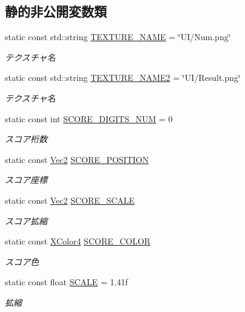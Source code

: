 \subsection*{静的非公開変数類}
\begin{DoxyCompactItemize}
\item 
static const std\+::string \mbox{\hyperlink{class_clear_logo_draw_aea89948b2e9b540fe35f1c910824c82f}{T\+E\+X\+T\+U\+R\+E\+\_\+\+N\+A\+ME}} = \char`\"{}UI/Num.\+png\char`\"{}
\begin{DoxyCompactList}\small\item\em テクスチャ名 \end{DoxyCompactList}\item 
static const std\+::string \mbox{\hyperlink{class_clear_logo_draw_a0688794f9d828c82cf0225ca91e4b491}{T\+E\+X\+T\+U\+R\+E\+\_\+\+N\+A\+M\+E2}} = \char`\"{}UI/Result.\+png\char`\"{}
\begin{DoxyCompactList}\small\item\em テクスチャ名 \end{DoxyCompactList}\item 
static const int \mbox{\hyperlink{class_clear_logo_draw_a50f368e8ecf24e1f701f7a522b9635f1}{S\+C\+O\+R\+E\+\_\+\+D\+I\+G\+I\+T\+S\+\_\+\+N\+UM}} = 0
\begin{DoxyCompactList}\small\item\em スコア桁数 \end{DoxyCompactList}\item 
static const \mbox{\hyperlink{_vector3_d_8h_a5ef6e95dfc5f9d3820b71772d99bbc25}{Vec2}} \mbox{\hyperlink{class_clear_logo_draw_ad3e2ab6e607fbf850696affe9ee47bd2}{S\+C\+O\+R\+E\+\_\+\+P\+O\+S\+I\+T\+I\+ON}}
\begin{DoxyCompactList}\small\item\em スコア座標 \end{DoxyCompactList}\item 
static const \mbox{\hyperlink{_vector3_d_8h_a5ef6e95dfc5f9d3820b71772d99bbc25}{Vec2}} \mbox{\hyperlink{class_clear_logo_draw_a38addcdd1692a417e62453f67c8065f5}{S\+C\+O\+R\+E\+\_\+\+S\+C\+A\+LE}}
\begin{DoxyCompactList}\small\item\em スコア拡縮 \end{DoxyCompactList}\item 
static const \mbox{\hyperlink{_vector3_d_8h_a680c30c4a07d86fe763c7e01169cd6cc}{X\+Color4}} \mbox{\hyperlink{class_clear_logo_draw_abe0a99d0920b3ad3a28077eb966d1fd5}{S\+C\+O\+R\+E\+\_\+\+C\+O\+L\+OR}}
\begin{DoxyCompactList}\small\item\em スコア色 \end{DoxyCompactList}\item 
static const float \mbox{\hyperlink{class_clear_logo_draw_afdf263982add6dd6b8ac167b3ef44dc0}{S\+C\+A\+LE}} = 1.\+41f
\begin{DoxyCompactList}\small\item\em 拡縮 \end{DoxyCompactList}\end{DoxyCompactItemize}


